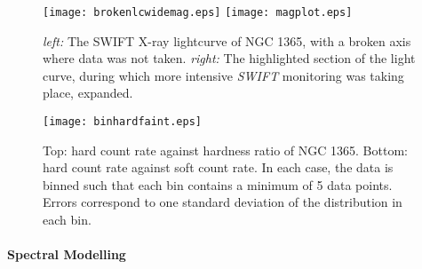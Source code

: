 \documentclass[letters,useAMS,usenatbib]{samnote}
\begin{document}
\begin{figure}

	\texttt{[image: brokenlcwidemag.eps]}
	\texttt{[image: magplot.eps]}
	\caption{{\it left:} The SWIFT X-ray lightcurve of NGC 1365, with a broken axis where data was not taken. {\it right:} The highlighted section of the light
curve, during which more intensive {\it SWIFT} monitoring was taking place, expanded.}
	\label{lc}

\end{figure}

\begin{figure}
	\centering
	\texttt{[image: binhardfaint.eps]}
	\caption{Top: hard count rate against hardness ratio of NGC 1365. Bottom: hard count rate against soft count rate. 
	In each case, the data is binned such that each bin contains a minimum of 5 data points. Errors correspond to one
	standard deviation of the distribution in each bin.}
	\label{hardness}
\end{figure}
				


\paragraph{Spectral Modelling}
\end{document}
